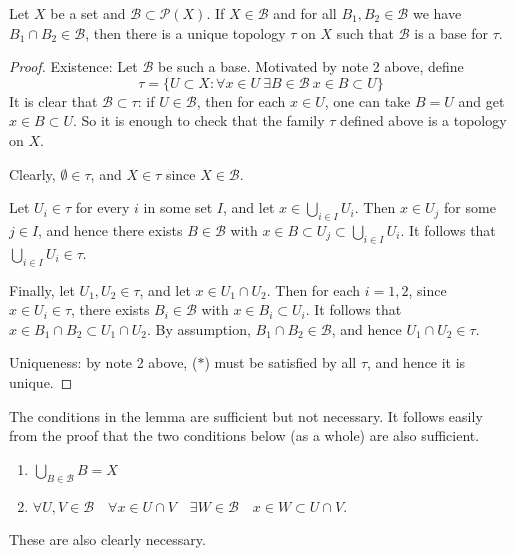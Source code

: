 \documentclass[a4paper]{article}
\begin{document}
\begin{lemma}\label{lma:4.7}
    Let $X$ be a set and $\mathcal{B} \subset \mathcal{P}(X)$. If $X \in \mathcal{B}$ and for all $B_{1}, B_{2} \in \mathcal{B}$ we have $B_{1} \cap B_{2} \in \mathcal{B}$, then there is a unique topology $\tau$ on $X$ such that $\mathcal{B}$ is a base for $\tau$.
\end{lemma}
\begin{proof}
    Existence: Let $\mathcal{B}$ be such a base. Motivated by note 2 above, define 
    \[
        \tau=\{U \subset X: \forall x \in U\ \exists B \in \mathcal{B}\ x \in B \subset U\} \tag{$*$}
    \]
    It is clear that $\mathcal{B} \subset \tau$: if $U \in \mathcal{B}$, then for each $x \in U$, one can take $B=U$ and get $x \in B \subset U$. So it is enough to check that the family $\tau$ defined above is a topology on $X$.

    Clearly, $\emptyset \in \tau$, and $X \in \tau$ since $X \in \mathcal{B}$.

    Let $U_{i} \in \tau$ for every $i$ in some set $I$, and let $x \in \bigcup_{i \in I} U_{i}$. Then $x \in U_{j}$ for some $j \in I$, and hence there exists $B \in \mathcal{B}$ with $x \in B \subset U_{j} \subset \bigcup_{i \in I} U_{i}$. It follows that $\bigcup_{i \in I} U_{i} \in \tau$. 

    Finally, let $U_{1}, U_{2} \in \tau$, and let $x \in U_{1} \cap U_{2}$. Then for each $i=1,2$, since $x \in U_{i} \in \tau$, there exists $B_{i} \in \mathcal{B}$ with $x \in B_{i} \subset U_{i}$. It follows that $x \in B_{1} \cap B_{2} \subset U_{1} \cap U_{2}$. By assumption, $B_{1} \cap B_{2} \in \mathcal{B}$, and hence $U_{1} \cap U_{2} \in \tau$.

    Uniqueness: by note 2 above, ($*$) must be satisfied by all $\tau$, and hence it is unique. 
\end{proof}

\begin{remark}
    The conditions in the lemma are sufficient but not necessary. It follows easily from the proof that the two conditions below (as a whole) are also sufficient.

\begin{enumerate}
    \item $\bigcup_{B \in \mathcal{B}} B=X$

    \item $\forall U, V \in \mathcal{B} \quad \forall x \in U \cap V \quad \exists W \in \mathcal{B} \quad x \in W \subset U \cap V$.
\end{enumerate}
These are also clearly necessary.
\end{remark}
\end{document}
